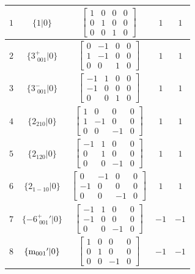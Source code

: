 \documentclass[fleqn,8pt]{jsarticle}
\begin{document}
\begin{longtable}{ccccc}
$ 1 $ & $ \{1|0\} $ & $ \begin{bmatrix} 1 & 0 & 0 & 0 \\ 0 & 1 & 0 & 0 \\ 0 & 0 & 1 & 0 \end{bmatrix} $ & $ 1 $ & $ 1 $ \\ \hline
$ 2 $ & $ \{3^{+}_{\,\,001}|0\} $ & $ \begin{bmatrix} 0 & -1 & 0 & 0 \\ 1 & -1 & 0 & 0 \\ 0 & 0 & 1 & 0 \end{bmatrix} $ & $ 1 $ & $ 1 $ \\ \hline
$ 3 $ & $ \{3^{-}_{\,\,001}|0\} $ & $ \begin{bmatrix} -1 & 1 & 0 & 0 \\ -1 & 0 & 0 & 0 \\ 0 & 0 & 1 & 0 \end{bmatrix} $ & $ 1 $ & $ 1 $ \\ \hline
$ 4 $ & $ \{2{}_{210}|0\} $ & $ \begin{bmatrix} 1 & 0 & 0 & 0 \\ 1 & -1 & 0 & 0 \\ 0 & 0 & -1 & 0 \end{bmatrix} $ & $ 1 $ & $ 1 $ \\ \hline
$ 5 $ & $ \{2{}_{120}|0\} $ & $ \begin{bmatrix} -1 & 1 & 0 & 0 \\ 0 & 1 & 0 & 0 \\ 0 & 0 & -1 & 0 \end{bmatrix} $ & $ 1 $ & $ 1 $ \\ \hline
$ 6 $ & $ \{2{}_{1-10}|0\} $ & $ \begin{bmatrix} 0 & -1 & 0 & 0 \\ -1 & 0 & 0 & 0 \\ 0 & 0 & -1 & 0 \end{bmatrix} $ & $ 1 $ & $ 1 $ \\ \hline
$ 7 $ & $ \{-6^{+}_{\,\,001}{}'|0\} $ & $ \begin{bmatrix} -1 & 1 & 0 & 0 \\ -1 & 0 & 0 & 0 \\ 0 & 0 & -1 & 0 \end{bmatrix} $ & $ -1 $ & $ -1 $ \\ \hline
$ 8 $ & $ \{{\rm m}_{001}{}'|0\} $ & $ \begin{bmatrix} 1 & 0 & 0 & 0 \\ 0 & 1 & 0 & 0 \\ 0 & 0 & -1 & 0 \end{bmatrix} $ & $ -1 $ & $ -1 $ \\ \hline

\end{longtable}
\end{document}
